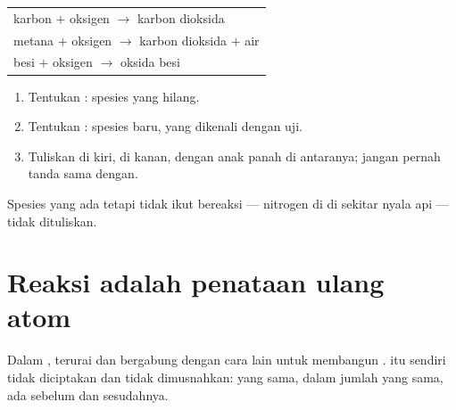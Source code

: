 \begin{example}\label{ex:g7:chemical-reactions:three}
\begin{center}
\begin{tabular}{l}
karbon $+$ oksigen $\longrightarrow$ karbon dioksida\\[2pt]
metana $+$ oksigen $\longrightarrow$ karbon dioksida $+$ air\\[2pt]
besi $+$ oksigen $\longrightarrow$ oksida besi
\end{tabular}
\end{center}
\end{example}

\begin{method}\label{met:g7:chemical-reactions:write}
\begin{enumerate}
  \item Tentukan : spesies yang hilang.
  \item Tentukan : spesies baru, yang dikenali dengan uji.
  \item Tuliskan  di kiri,  di kanan, dengan anak panah di
        antaranya; jangan pernah tanda sama dengan.
\end{enumerate}
Spesies yang ada tetapi tidak ikut bereaksi --- nitrogen di  di
sekitar nyala api --- tidak dituliskan.
\end{method}

\section{Reaksi adalah penataan ulang atom}

\begin{proposition}\label{prop:g7:chemical-reactions:rearranged}
Dalam ,   terurai dan 
bergabung dengan cara lain untuk membangun  .
 itu sendiri tidak diciptakan dan tidak dimusnahkan: 
yang sama, dalam jumlah yang sama, ada sebelum dan sesudahnya.
\end{proposition}

